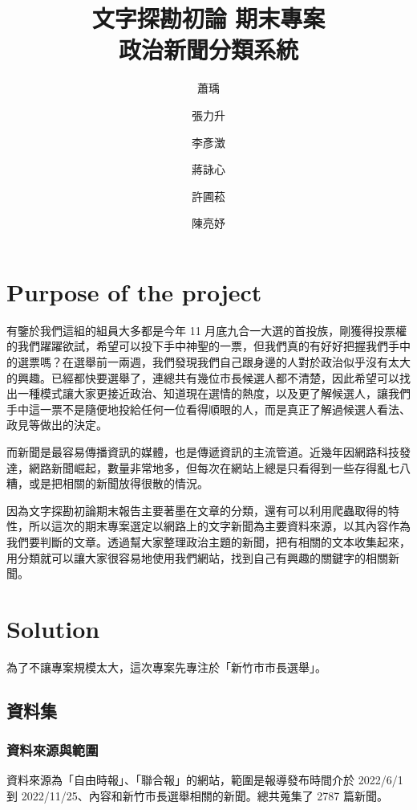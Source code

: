\documentclass[12pt,cleanfoot,twocolumn]{asme2ej}
\title{文字探勘初論 期末專案\\
        政治新聞分類系統}
\author{蕭瑀
\affiliation{
        系級: 資管四\\
        學號: B08705059
}}
\author{張力升
\affiliation{
    系級: 資管三\\
    學號: B09705007
}}
\author{李彥澂
\affiliation{
    系級: 資管三\\
    學號: B09705012
}}
\author{蔣詠心
\affiliation{
    系級: 資管三\\
    學號: B09705020
}}
\author{許圃菘
\affiliation{
        系級: 資管三\\
        學號: B09705027
}}
\author{陳亮妤
\affiliation{
        系級: 資管三\\
        學號: B09705033
}}
\begin{document}
\maketitle

\section{Purpose of the project}
有鑒於我們這組的組員大多都是今年 11 月底九合一大選的首投族，剛獲得投票權的我們躍躍欲試，希望可以投下手中神聖的一票，但我們真的有好好把握我們手中的選票嗎？在選舉前一兩週，我們發現我們自己跟身邊的人對於政治似乎沒有太大的興趣。已經都快要選舉了，連總共有幾位市長候選人都不清楚，因此希望可以找出一種模式讓大家更接近政治、知道現在選情的熱度，以及更了解候選人，讓我們手中這一票不是隨便地投給任何一位看得順眼的人，而是真正了解過候選人看法、政見等做出的決定。

而新聞是最容易傳播資訊的媒體，也是傳遞資訊的主流管道。近幾年因網路科技發達，網路新聞崛起，數量非常地多，但每次在網站上總是只看得到一些存得亂七八糟，或是把相關的新聞放得很散的情況。

因為文字探勘初論期末報告主要著墨在文章的分類，還有可以利用爬蟲取得的特性，所以這次的期末專案選定以網路上的文字新聞為主要資料來源，以其內容作為我們要判斷的文章。透過幫大家整理政治主題的新聞，把有相關的文本收集起來，用分類就可以讓大家很容易地使用我們網站，找到自己有興趣的關鍵字的相關新聞。

\section{Solution}
為了不讓專案規模太大，這次專案先專注於「新竹市市長選舉」。

\subsection{資料集}
\subsubsection{資料來源與範圍}
資料來源為「自由時報」、「聯合報」的網站，範圍是報導發布時間介於 2022/6/1 到 2022/11/25、內容和新竹市長選舉相關的新聞。總共蒐集了 2787 篇新聞。
\end{document}
